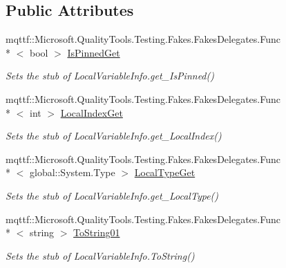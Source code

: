 \subsection*{Public Attributes}
\begin{DoxyCompactItemize}
\item 
mqttf\-::\-Microsoft.\-Quality\-Tools.\-Testing.\-Fakes.\-Fakes\-Delegates.\-Func\\*
$<$ bool $>$ \hyperlink{class_system_1_1_reflection_1_1_fakes_1_1_stub_local_variable_info_acaad85a8a1adbef9c8f7ebd8df9e7430}{Is\-Pinned\-Get}
\begin{DoxyCompactList}\small\item\em Sets the stub of Local\-Variable\-Info.\-get\-\_\-\-Is\-Pinned()\end{DoxyCompactList}\item 
mqttf\-::\-Microsoft.\-Quality\-Tools.\-Testing.\-Fakes.\-Fakes\-Delegates.\-Func\\*
$<$ int $>$ \hyperlink{class_system_1_1_reflection_1_1_fakes_1_1_stub_local_variable_info_a040c2dbc50107b3d9dd43a4e79b48833}{Local\-Index\-Get}
\begin{DoxyCompactList}\small\item\em Sets the stub of Local\-Variable\-Info.\-get\-\_\-\-Local\-Index()\end{DoxyCompactList}\item 
mqttf\-::\-Microsoft.\-Quality\-Tools.\-Testing.\-Fakes.\-Fakes\-Delegates.\-Func\\*
$<$ global\-::\-System.\-Type $>$ \hyperlink{class_system_1_1_reflection_1_1_fakes_1_1_stub_local_variable_info_aa4784f9b1ada359169579fe3a1798610}{Local\-Type\-Get}
\begin{DoxyCompactList}\small\item\em Sets the stub of Local\-Variable\-Info.\-get\-\_\-\-Local\-Type()\end{DoxyCompactList}\item 
mqttf\-::\-Microsoft.\-Quality\-Tools.\-Testing.\-Fakes.\-Fakes\-Delegates.\-Func\\*
$<$ string $>$ \hyperlink{class_system_1_1_reflection_1_1_fakes_1_1_stub_local_variable_info_aed034d75d2d7ce6047c8819c1d114913}{To\-String01}
\begin{DoxyCompactList}\small\item\em Sets the stub of Local\-Variable\-Info.\-To\-String()\end{DoxyCompactList}\end{DoxyCompactItemize}
